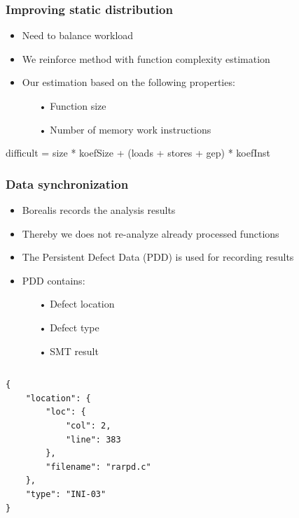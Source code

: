 
\begin{frame}
\frametitle{Improving static distribution}
\begin{itemize}
\item Need to balance workload
\item We reinforce method with function complexity estimation
\item Our estimation based on the following properties:
	\begin{itemize}
		\item[•] Function size
		\item[•] Number of memory work instructions
	\end{itemize}
\end{itemize}
difficult = size * koefSize + (loads + stores + gep) * koefInst
\end{frame}


\begin{frame}[fragile]
\frametitle{Data synchronization}
\begin{itemize}
\item Borealis records the analysis results  
\item Thereby we does not re-analyze already processed functions
\item The Persistent Defect Data (PDD) is used for recording results
\item PDD contains:
	\begin{itemize}
		\item[•] Defect location
		\item[•] Defect type
		\item[•] SMT result
	\end{itemize}
\end{itemize}
\begin{columns} 
\begin{lstlisting}[style=crs_cpp] 
{
    "location": {
        "loc": {
            "col": 2,
            "line": 383
        },
        "filename": "rarpd.c"
    },
    "type": "INI-03"
}
\end{lstlisting} 
\end{columns}
\end{frame}

